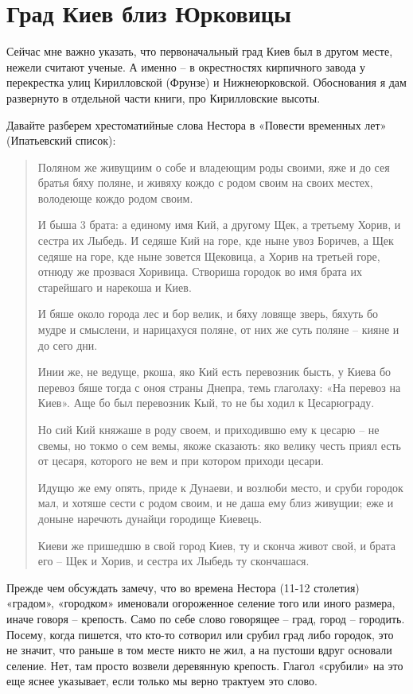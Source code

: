 \chapter{Град Киев близ Юрковицы}

Сейчас мне важно указать, что первоначальный град Киев был в другом месте, нежели считают ученые. А именно – в окрестностях кирпичного завода у перекрестка улиц Кирилловской (Фрунзе) и Нижнеюрковской. Обоснования я дам развернуто в отдельной части книги, про Кирилловские высоты.

Давайте разберем хрестоматийные слова Нестора в «Повести временных лет» (Ипатьевский список):

\begin{quotation}  
Поляном же живущиим о собе и владеющим роды своими, яже и до сея братья бяху поляне, и живяху кождо с родом своим на своих местех, володеюще кождо родом своим. 

И быша 3 брата: а единому имя Кий, а другому Щек, а третьему Хорив, и сестра их Лыбедь. И седяше Кий на горе, кде ныне увоз Боричев, а Щек седяше на горе, кде ныне зовется Щековица, а Хорив на третьей горе, отнюду же прозвася Хоривица. Створиша городок во имя брата их старейшаго и нарекоша и Киев. 

И бяше около города лес и бор велик, и бяху ловяще зверь, бяхуть бо мудре и смыслени, и нарицахуся поляне, от них же суть поляне – кияне и до сего дни.

Инии же, не ведуще, ркоша, яко Кий есть перевозник бысть, у Киева бо перевоз бяше тогда с оноя страны Днепра, темь глаголаху: «На перевоз на Киев». Аще бо был перевозник Кый, то не бы ходил к Цесарюграду. 

Но сий Кий княжаше в роду своем, и приходившю ему к цесарю – не свемы, но токмо о сем вемы, якоже сказають: яко велику честь приял есть от цесаря, которого не вем и при котором приходи цесари. 

Идущю же ему опять, приде к Дунаеви, и возлюби место, и сруби городок мал, и хотяше сести с родом своим, и не даша ему близ живущии; еже и доныне наречють дунайци городище Киевець. 

Киеви же пришедшю в свой город Киев, ту и сконча живот свой, и брата его – Щек и Хорив, и сестра их Лыбедь ту скончашася.
\end{quotation}  

Прежде чем обсуждать замечу, что во времена Нестора (11-12 столетия) «градом», «городком» именовали огороженное селение того или иного размера, иначе говоря – крепость. Само по себе слово говорящее – град, город – городить. Посему, когда пишется, что кто-то сотворил или срубил град либо городок, это не значит, что раньше в том месте никто не жил, а на пустоши вдруг основали селение. Нет, там просто возвели деревянную крепость. Глагол «срубили» на это еще яснее указывает, если только мы верно трактуем это слово. 

